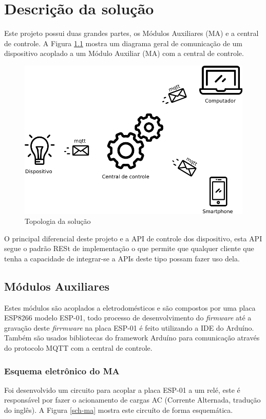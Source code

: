 \chapter{Descrição da solução}

Este projeto possui duas grandes partes, os Módulos Auxiliares (MA) e a central de controle. A Figura \ref{dispositivos} mostra um diagrama geral de comunicação de um dispositivo acoplado a um Módulo Auxiliar (MA) com a central de controle.

\begin{figure}[H]
\caption{\label{dispositivos} Topologia da solução}
\includegraphics[scale=0.5]{img/arquitetura-basica-2.png}
\end{figure}

O principal diferencial deste projeto e a API de controle dos dispositivo, esta API segue o padrão RESt de implementação o que permite que qualquer cliente que tenha a capacidade de integrar-se a APIs deste tipo possam fazer uso dela.

\section{Módulos Auxiliares}
Estes módulos são acoplados a eletrodomésticos e são compostos por uma placa ESP8266 modelo ESP-01, todo processo de desenvolvimento do \textit{firmware} até a gravação deste \textit{firrmware} na placa ESP-01 é feito utilizando a IDE do Arduíno. Também são usados bibliotecas do framework Arduíno para comunicação através do protocolo MQTT com a central de controle.

\subsection{Esquema eletrônico do MA}
Foi desenvolvido um circuito para acoplar a placa ESP-01 a um relé, este é responsável por fazer o acionamento de cargas AC (Corrente Alternada, tradução do inglês). A Figura \ref{sch-ma} mostra este circuíto de forma esquemática.

